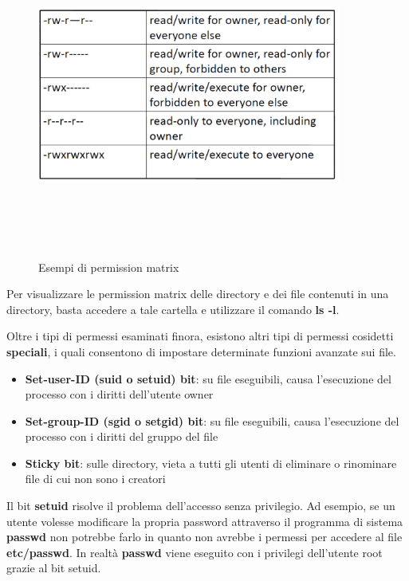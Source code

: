 \begin{figure}[htbp]
	\centering%
	\subfigure%
	{\includegraphics[height=10cm, width=10cm, keepaspectratio]{Immagini/sistemi_operativi/perm_linux.png}}
	\caption{Esempi di permission matrix \label{fig:perm_linux}} 	
\end{figure}

Per visualizzare le permission matrix delle directory e dei file contenuti in una directory, basta accedere a tale cartella e utilizzare il comando \textbf{ls -l}. \newline \newline

Oltre i tipi di permessi esaminati finora, esistono altri tipi di permessi cosidetti \textbf{speciali}, i quali consentono di impostare determinate funzioni avanzate sui file.

\begin{itemize}
  \item \textbf{Set-user-ID (suid o setuid) bit}: su file eseguibili, causa l’esecuzione del processo con i diritti dell’utente owner
  \item \textbf{Set-group-ID (sgid o setgid) bit}: su file eseguibili, causa l’esecuzione del processo con i diritti del gruppo del file
  \item \textbf{Sticky bit}: sulle directory, vieta a tutti gli utenti di eliminare o rinominare file di cui non sono i creatori
\end{itemize}

Il bit \textbf{setuid} risolve il problema dell'accesso senza privilegio. Ad esempio, se un utente volesse modificare la propria password attraverso il programma di sistema \textbf{passwd} non potrebbe farlo in quanto non avrebbe i permessi per accedere al file \textbf{etc/passwd}. In realtà \textbf{passwd} viene eseguito con i privilegi dell'utente root grazie al bit setuid.

